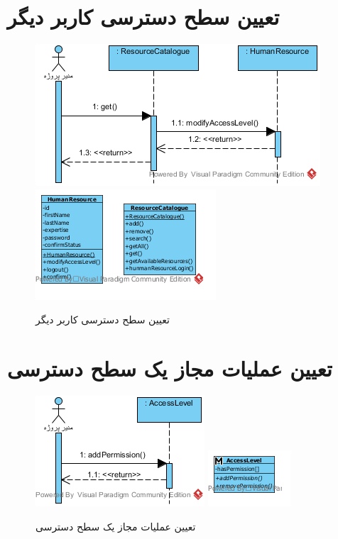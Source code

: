 \section{تعیین سطح دسترسی کاربر دیگر}
\begin{figure}[H]
	\centering
	\includegraphics[scale=0.8]{img/sequence-analysis/SetUserAccessLevel}
	\includegraphics[scale=0.8]{img/sequence-analysis/SetUserAccessLevelC}
		\caption{تعیین سطح دسترسی کاربر دیگر}
\end{figure}


\section{تعیین عملیات مجاز یک سطح دسترسی}
\begin{figure}[H]
	\centering
	\includegraphics[scale=0.8]{img/sequence-analysis/SetPermissions}
	\includegraphics[scale=0.8]{img/sequence-analysis/SetPermissionsC}
	\caption{تعیین عملیات مجاز یک سطح دسترسی}
\end{figure}



